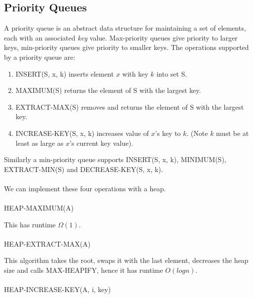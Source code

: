 \documentclass{article}
\begin{document}
    \subsection{Priority Queues}
        A priority queue is an abstract data structure for maintaining a set of elements, each with an associated \textit{key} value. Max-priority queues give priority to larger keys, min-priority queues give priority to smaller keys. The operations supported by a priority queue are:
        \begin{enumerate}
            \item INSERT(S, x, k) inserts element $x$ with key $k$ into set S. 
            \item MAXIMUM(S) returns the element of S with the largest key.
            \item EXTRACT-MAX(S) removes and returns the element of S with the largest key.
            \item INCREASE-KEY(S, x, k) increases value of $x$'s key to $k$. (Note $k$ must be at least as large as $x$'s current key value).
        \end{enumerate}
        Similarly a min-priority queue supports INSERT(S, x, k), MINIMUM(S), EXTRACT-MIN(S) and DECREASE-KEY(S, x, k). \\ \\
        We can implement these four operations with a heap. \\ \\
        HEAP-MAXIMUM(A)
        \begin{algorithmic}[1]
        \end{algorithmic}
        This has runtime $\Omega(1)$. \\ \\
        HEAP-EXTRACT-MAX(A)
        \begin{algorithmic}[1]
            \EndIf
        \end{algorithmic}
        This algorithm takes the root, swaps it with the last element, decreases the heap size and calls MAX-HEAPIFY, hence it has runtime $O(log n)$. \\ \\
        HEAP-INCREASE-KEY(A, i, key)
        \begin{algorithmic}[1]
            \EndIf
            \EndWhile
        \end{algorithmic}
\end{document}
